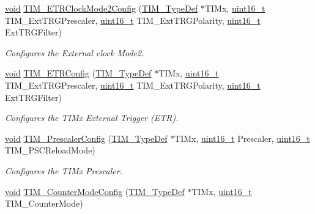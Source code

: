 \begin{DoxyCompactItemize}
\hyperlink{usb__devapi_8h_afabf60e7f57651d6d595a02c75f07cd0}{void} \hyperlink{group___t_i_m___private___functions_ga0a9cbcbab32326cbbdaf4c111f59ec20}{T\+I\+M\+\_\+\+E\+T\+R\+Clock\+Mode2\+Config} (\hyperlink{struct_t_i_m___type_def}{T\+I\+M\+\_\+\+Type\+Def} $\ast$T\+I\+Mx, \hyperlink{_p_e___types_8h_a1f1825b69244eb3ad2c7165ddc99c956}{uint16\+\_\+t} T\+I\+M\+\_\+\+Ext\+T\+R\+G\+Prescaler, \hyperlink{_p_e___types_8h_a1f1825b69244eb3ad2c7165ddc99c956}{uint16\+\_\+t} T\+I\+M\+\_\+\+Ext\+T\+R\+G\+Polarity, \hyperlink{_p_e___types_8h_a1f1825b69244eb3ad2c7165ddc99c956}{uint16\+\_\+t} Ext\+T\+R\+G\+Filter)
\begin{DoxyCompactList}\small\item\em Configures the External clock Mode2. \end{DoxyCompactList}\item 
\hyperlink{usb__devapi_8h_afabf60e7f57651d6d595a02c75f07cd0}{void} \hyperlink{group___t_i_m___private___functions_ga8bdde400b7a30f3e747fe8e4962c0abe}{T\+I\+M\+\_\+\+E\+T\+R\+Config} (\hyperlink{struct_t_i_m___type_def}{T\+I\+M\+\_\+\+Type\+Def} $\ast$T\+I\+Mx, \hyperlink{_p_e___types_8h_a1f1825b69244eb3ad2c7165ddc99c956}{uint16\+\_\+t} T\+I\+M\+\_\+\+Ext\+T\+R\+G\+Prescaler, \hyperlink{_p_e___types_8h_a1f1825b69244eb3ad2c7165ddc99c956}{uint16\+\_\+t} T\+I\+M\+\_\+\+Ext\+T\+R\+G\+Polarity, \hyperlink{_p_e___types_8h_a1f1825b69244eb3ad2c7165ddc99c956}{uint16\+\_\+t} Ext\+T\+R\+G\+Filter)
\begin{DoxyCompactList}\small\item\em Configures the T\+I\+Mx External Trigger (E\+TR). \end{DoxyCompactList}\item 
\hyperlink{usb__devapi_8h_afabf60e7f57651d6d595a02c75f07cd0}{void} \hyperlink{group___t_i_m___private___functions_ga45c6fd9041baf7f64c121e0172f305c7}{T\+I\+M\+\_\+\+Prescaler\+Config} (\hyperlink{struct_t_i_m___type_def}{T\+I\+M\+\_\+\+Type\+Def} $\ast$T\+I\+Mx, \hyperlink{_p_e___types_8h_a1f1825b69244eb3ad2c7165ddc99c956}{uint16\+\_\+t} Prescaler, \hyperlink{_p_e___types_8h_a1f1825b69244eb3ad2c7165ddc99c956}{uint16\+\_\+t} T\+I\+M\+\_\+\+P\+S\+C\+Reload\+Mode)
\begin{DoxyCompactList}\small\item\em Configures the T\+I\+Mx Prescaler. \end{DoxyCompactList}\item 
\hyperlink{usb__devapi_8h_afabf60e7f57651d6d595a02c75f07cd0}{void} \hyperlink{group___t_i_m___private___functions_ga93941c1db20bf3794f377307df90a67b}{T\+I\+M\+\_\+\+Counter\+Mode\+Config} (\hyperlink{struct_t_i_m___type_def}{T\+I\+M\+\_\+\+Type\+Def} $\ast$T\+I\+Mx, \hyperlink{_p_e___types_8h_a1f1825b69244eb3ad2c7165ddc99c956}{uint16\+\_\+t} T\+I\+M\+\_\+\+Counter\+Mode)

\end{DoxyCompactItemize}

